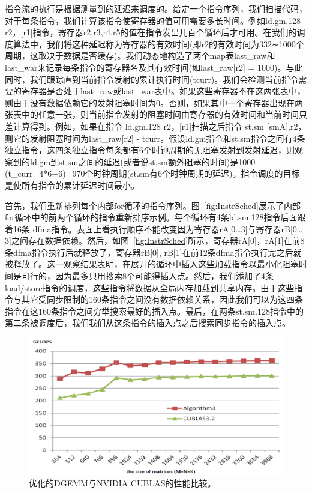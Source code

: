 \begin{flushleft}
指令流的执行是根据测量到的延迟来调度的。给定一个指令序列，我们扫描代码，对于每条指令，我们计算该指令使寄存器的值可用需要多长时间。例如ld.gm.128 r2，[r1]指令，寄存器r2,r3,r4,r5的值在指令发出几百个循环后才可用。在我们的调度算法中，我们将这种延迟称为寄存器的有效时间(即r2的有效时间为332∼1000个周期，这取决于数据是否缓存)。我们动态地构造了两个map表last\_raw和last\_war来记录每条指令的寄存器名及其有效时间(如last\_raw[r2] = 1000)。与此同时，我们跟踪直到当前指令发射的累计执行时间(tcurr)。我们会检测当前指令需要的寄存器是否处于last\_raw或last\_war表中。如果这些寄存器不在这两张表中，则由于没有数据依赖它的发射阻塞时间为0。否则，如果其中一个寄存器出现在两张表中的任意一张，则当前指令发射的阻塞时间由寄存器的有效时间和当前时间只差计算得到。例如，如果在指令 ld.gm.128 r2，[r1]扫描之后指令 st.sm [smA],r2，则它的发射阻塞时间为last\_raw[r2] - tcurr。假设ld.gm指令和st.sm指令之间有4条独立指令，这四条独立指令每条都有6个时钟周期的无阻塞发射到发射延迟，则观察到的ld.gm到st.sm之间的延迟(或者说st.sm额外阻塞的时间)是1000-(t\_curr=4*6+6)=970个时钟周期(st.sm有6个时钟周期的延迟)。指令调度的目标是使所有指令的累计延迟时间最小。


首先，我们重新排列每个内部for循环的指令序列。图~\ref{fig:InstrSched}展示了内部for循环中的前两个循环的指令重新排序示例。每个循环有4条ld.sm.128指令后面跟着16条 dfma指令。表面上看执行顺序不能改变因为寄存器rA[0…3]与寄存器rB[0…3]之间存在数据依赖。然后，如图~\ref{fig:InstrSched}所示，寄存器rA[0]，rA[1]在前8条dfma指令执行后就释放了，寄存器rB[0], rB[1]在前12条dfma指令执行完之后就被释放了。这一观察结果表明，在展开的循环中插入这些加载指令以最小化阻塞时间是可行的，因为最多只用搜索8个可能得插入点。然后，我们添加了4条load/store指令的调度，这些指令将数据从全局内存加载到共享内存。由于这些指令与其它受同步限制的160条指令之间没有数据依赖关系，因此我们可以为这四条指令在这160条指令之间穷举搜索最好的插入点。最后，在两条st.sm.128指令中的第二条被调度后，我们我们从这条指令的插入点之后搜索同步指令的插入点。


\begin{figure}[htbp]
	\begin{center}
		\includegraphics[scale=0.8]{Img/Chap_Algorithm/DGEMMPerf}
		\caption{优化的DGEMM与NVIDIA CUBLAS的性能比较。} \label{fig:DGEMMPerf}
	\end{center}
\end{figure}


\end{flushleft}

